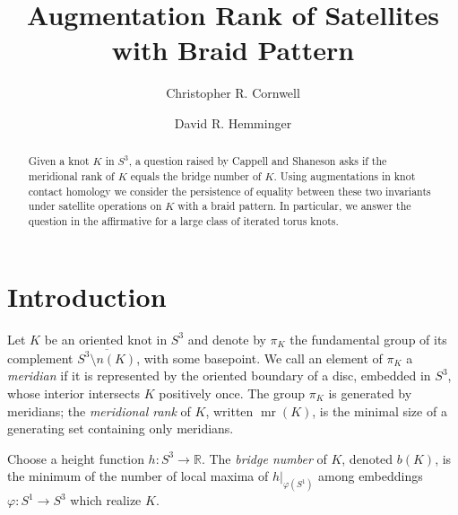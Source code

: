 \documentclass[11pt]{amsart}
\makeatletter
\def\R{{\mathbb R}}
\def\mr{\operatorname{mr}}
\theoremstyle{definition}
\def\listtodoname{List of Todos}
\def\listoftodos{\@starttoc{tdo}\listtodoname}
\makeatother
\begin{document}





\title{Augmentation Rank of Satellites with Braid Pattern}

\author{Christopher R. Cornwell}
\author{David R. Hemminger}

\begin{abstract}
Given a knot $K$ in $S^3$, a question raised by Cappell and Shaneson asks if the meridional rank of $K$ equals the bridge number of $K$. Using augmentations in knot contact homology we consider the persistence of equality between these two invariants under satellite operations on $K$ with a braid pattern. In particular, we answer the question in the affirmative for a large class of iterated torus knots.
\end{abstract}

\maketitle

\section{Introduction}
Let $K$ be an oriented knot in $S^3$ and denote by $\pi_K$ the fundamental group of its complement $\overline{S^3\setminus n(K)}$, with some basepoint. We call an element of $\pi_K$ a \emph{meridian} if it is represented by the oriented boundary of a disc, embedded in $S^3$, whose interior intersects $K$ positively once. The group $\pi_K$ is generated by meridians; the \emph{meridional rank} of $K$, written $\mr(K)$, is the minimal size of a generating set containing only meridians. 

Choose a height function $h:S^3\to\R$. The \emph{bridge number} of $K$, denoted $b(K)$, is the minimum of the number of local maxima of $h|_{\varphi(S^1)}$ among embeddings $\varphi:S^1\to S^3$ which realize $K$.
\end{document}
